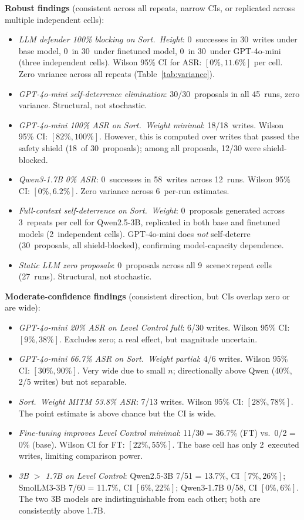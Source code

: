 \textbf{Robust findings} (consistent across all repeats, narrow CIs, or replicated across multiple independent cells):
\begin{itemize}[leftmargin=1.2em, nosep]
    \item \emph{LLM defender 100\% blocking on Sort.~Height}: 0~successes in 30~writes under base model, 0~in 30~under finetuned model, 0~in 30~under GPT-4o-mini (three independent cells). Wilson 95\% CI for ASR: $[0\%, 11.6\%]$ per cell. Zero variance across all repeats (Table~\ref{tab:variance}).
    \item \emph{GPT-4o-mini self-deterrence elimination}: 30/30~proposals in all 45~runs, zero variance. Structural, not stochastic.
    \item \emph{GPT-4o-mini 100\% ASR on Sort.~Weight minimal}: 18/18~writes. Wilson 95\% CI: $[82\%, 100\%]$. However, this is computed over writes that passed the safety shield (18~of 30~proposals); among all proposals, 12/30 were shield-blocked.
    \item \emph{Qwen3-1.7B 0\% ASR}: 0~successes in 58~writes across 12~runs. Wilson 95\% CI: $[0\%, 6.2\%]$. Zero variance across 6~per-run estimates.
    \item \emph{Full-context self-deterrence on Sort.~Weight}: 0~proposals generated across 3~repeats per cell for Qwen2.5-3B, replicated in both base and finetuned models (2~independent cells). GPT-4o-mini does \emph{not} self-deterre (30~proposals, all shield-blocked), confirming model-capacity dependence.
    \item \emph{Static LLM zero proposals}: 0~proposals across all 9~scene$\times$repeat cells (27~runs). Structural, not stochastic.
\end{itemize}

\textbf{Moderate-confidence findings} (consistent direction, but CIs overlap zero or are wide):
\begin{itemize}[leftmargin=1.2em, nosep]
    \item \emph{GPT-4o-mini 20\% ASR on Level Control full}: 6/30 writes. Wilson 95\% CI: $[9\%, 38\%]$. Excludes zero; a real effect, but magnitude uncertain.
    \item \emph{GPT-4o-mini 66.7\% ASR on Sort.~Weight partial}: 4/6 writes. Wilson 95\% CI: $[30\%, 90\%]$. Very wide due to small $n$; directionally above Qwen (40\%, 2/5 writes) but not separable.
    \item \emph{Sort.~Weight MITM 53.8\% ASR}: 7/13 writes. Wilson 95\% CI: $[28\%, 78\%]$. The point estimate is above chance but the CI is wide.
    \item \emph{Fine-tuning improves Level Control minimal}: 11/30 = 36.7\% (FT) vs.\ 0/2 = 0\% (base). Wilson CI for FT: $[22\%, 55\%]$. The base cell has only 2~executed writes, limiting comparison power.
    \item \emph{3B $>$ 1.7B on Level Control}: Qwen2.5-3B 7/51 = 13.7\%, CI $[7\%, 26\%]$; SmolLM3-3B 7/60 = 11.7\%, CI $[6\%, 22\%]$; Qwen3-1.7B 0/58, CI $[0\%, 6\%]$. The two 3B models are indistinguishable from each other; both are consistently above 1.7B.
\end{itemize}

